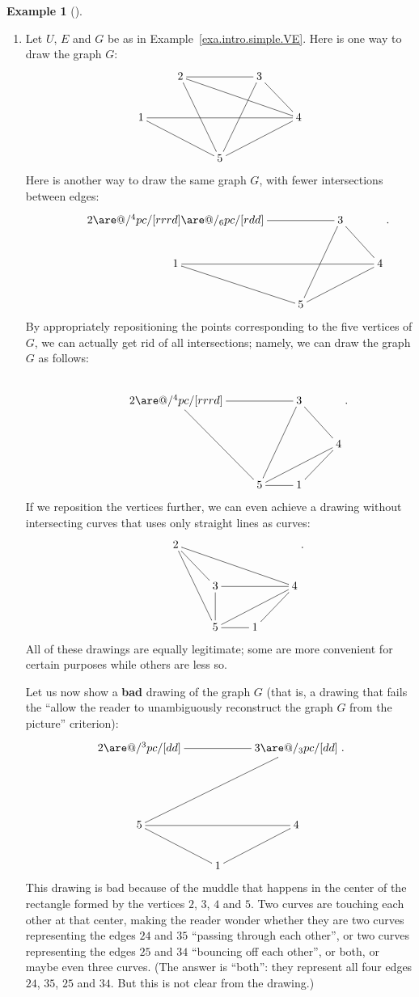 \documentclass[numbers=enddot,12pt,final,onecolumn,notitlepage]{scrartcl}%
\makeatletter
\theoremstyle{definition}
\newtheorem{exam}[theo]{Example}
\newenvironment{example}[1][]
{\begin{exam}[#1]\begin{leftbar}}
{\end{leftbar}\end{exam}}
\newcommand{\are}{\ar@{-}}
\makeatother
\begin{document}
\begin{example}
\begin{enumerate}
\item[\textbf{(b)}] Let $U$, $E$ and $G$ be as in
Example~\ref{exa.intro.simple.VE}. Here is one way to draw the graph
$G$:
\begin{align*}
\xymatrix{
& 2 \are[rr] \are[rrrd] \are[rdd] & & 3 \are[rd] \are[ldd] \\
1 \are[rrrr] \are[rrd] & & & & 4 \are[lld] \\
& & 5
}
\end{align*}
Here is another way to draw the same graph $G$, with fewer
intersections between edges:
\begin{align*}
\xymatrix{
& 2 \are[rr] \are@/^4pc/[rrrd] \are@/_6pc/[rdd] & & 3 \are[rd] \are[ldd] \\
& 1 \are[rrr] \are[rd] & & & 4 \are[lld] \\
& & 5
} .
\end{align*}
By appropriately repositioning the points corresponding to the five
vertices of $G$, we can actually get rid of all intersections; namely,
we can draw the graph $G$ as follows:
\begin{align*}
\phantom{a} \\ %
\xymatrix{
& 2 \are[rr] \are@/^4pc/[rrrd] \are[rdd] & & 3 \are[rd] \are[ldd] \\
& & & & 4 \are[lld] \\
& & 5 \are[r] & 1 \are[ru]
} .
\end{align*}
If we reposition the vertices further, we can even achieve a drawing
without intersecting curves that uses only straight lines as curves:
\begin{align*}
\xymatrix{
& 2 \are[rd] \are[rrrd] \are[rdd] \\
& & 3 \are[d] \are[rr] & & 4 \are[lld] \\
& & 5 \are[r] & 1 \are[ru]
} .
\end{align*}
All of these drawings are equally legitimate; some are more convenient
for certain purposes while others are less so.

Let us now show a \textbf{bad} drawing of the graph $G$ (that is, a
drawing that fails the ``allow the reader to
unambiguously reconstruct the graph $G$ from the picture'' criterion):
\begin{align*}
\xymatrix{
2 \are[rr] \are@/^3pc/[dd] & & 3 \are@/_3pc/[dd] \are[lldd] \\
& \\
5 \are[rr] \are[rd] & & 4 \are[ld] \\
& 1
} .
\end{align*}
This drawing is bad because of the muddle that happens in the center
of the rectangle formed by the vertices $2$, $3$, $4$ and $5$. Two
curves are touching each other at that center, making the reader
wonder whether they are two curves representing the edges $24$ and
$35$ ``passing through each other'', or two curves representing the
edges $25$ and $34$ ``bouncing off each other'', or both, or maybe
even three curves. (The answer is ``both'': they represent all four
edges $24$, $35$, $25$ and $34$. But this is not clear from the
drawing.)


\end{enumerate}
\end{example}
\end{document}
